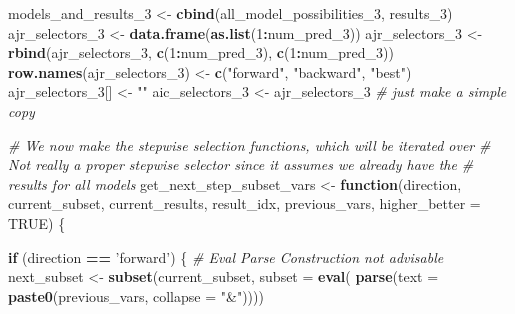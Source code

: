 \documentclass[
]{article}
\newenvironment{Shaded}{\begin{snugshade}}{\end{snugshade}}
\newcommand{\CommentTok}[1]{\textcolor[rgb]{0.56,0.35,0.01}{\textit{#1}}}
\newcommand{\ControlFlowTok}[1]{\textcolor[rgb]{0.13,0.29,0.53}{\textbf{#1}}}
\newcommand{\DataTypeTok}[1]{\textcolor[rgb]{0.13,0.29,0.53}{#1}}
\newcommand{\DecValTok}[1]{\textcolor[rgb]{0.00,0.00,0.81}{#1}}
\newcommand{\KeywordTok}[1]{\textcolor[rgb]{0.13,0.29,0.53}{\textbf{#1}}}
\newcommand{\NormalTok}[1]{#1}
\newcommand{\OperatorTok}[1]{\textcolor[rgb]{0.81,0.36,0.00}{\textbf{#1}}}
\newcommand{\OtherTok}[1]{\textcolor[rgb]{0.56,0.35,0.01}{#1}}
\newcommand{\StringTok}[1]{\textcolor[rgb]{0.31,0.60,0.02}{#1}}
\begin{document}
\begin{Shaded}
\begin{Highlighting}[]
\NormalTok{models_and_results_}\DecValTok{3}\NormalTok{ <-}\StringTok{ }\KeywordTok{cbind}\NormalTok{(all_model_possibilities_}\DecValTok{3}\NormalTok{, results_}\DecValTok{3}\NormalTok{)}
\NormalTok{ajr_selectors_}\DecValTok{3}\NormalTok{ <-}\StringTok{ }\KeywordTok{data.frame}\NormalTok{(}\KeywordTok{as.list}\NormalTok{(}\DecValTok{1}\OperatorTok{:}\NormalTok{num_pred_}\DecValTok{3}\NormalTok{))}
\NormalTok{ajr_selectors_}\DecValTok{3}\NormalTok{ <-}\StringTok{ }\KeywordTok{rbind}\NormalTok{(ajr_selectors_}\DecValTok{3}\NormalTok{,}
                        \KeywordTok{c}\NormalTok{(}\DecValTok{1}\OperatorTok{:}\NormalTok{num_pred_}\DecValTok{3}\NormalTok{),}
                        \KeywordTok{c}\NormalTok{(}\DecValTok{1}\OperatorTok{:}\NormalTok{num_pred_}\DecValTok{3}\NormalTok{))}
\KeywordTok{row.names}\NormalTok{(ajr_selectors_}\DecValTok{3}\NormalTok{) <-}\StringTok{ }\KeywordTok{c}\NormalTok{(}\StringTok{"forward"}\NormalTok{, }\StringTok{"backward"}\NormalTok{, }\StringTok{"best"}\NormalTok{)}
\NormalTok{ajr_selectors_}\DecValTok{3}\NormalTok{[] <-}\StringTok{ ""}
\NormalTok{aic_selectors_}\DecValTok{3}\NormalTok{ <-}\StringTok{ }\NormalTok{ajr_selectors_}\DecValTok{3}  \CommentTok{# just make a simple copy}

\CommentTok{# We now make the stepwise selection functions, which will be iterated over}
\CommentTok{# Not really a proper stepwise selector since it assumes we already have the }
\CommentTok{# results for all models}
\NormalTok{get_next_step_subset_vars <-}\StringTok{ }\ControlFlowTok{function}\NormalTok{(direction, current_subset,}
\NormalTok{                                      current_results, result_idx,}
\NormalTok{                                      previous_vars, }\DataTypeTok{higher_better =} \OtherTok{TRUE}\NormalTok{) \{}




  \ControlFlowTok{if}\NormalTok{ (direction }\OperatorTok{==}\StringTok{ 'forward'}\NormalTok{) \{}
    \CommentTok{# Eval Parse Construction not advisable}
\NormalTok{    next_subset <-}\StringTok{ }\KeywordTok{subset}\NormalTok{(current_subset,}
                          \DataTypeTok{subset =} \KeywordTok{eval}\NormalTok{(}
                            \KeywordTok{parse}\NormalTok{(}\DataTypeTok{text =} \KeywordTok{paste0}\NormalTok{(previous_vars,}
                                                \DataTypeTok{collapse =} \StringTok{"&"}\NormalTok{))))}


\end{Highlighting}
\end{Shaded}
\end{document}
